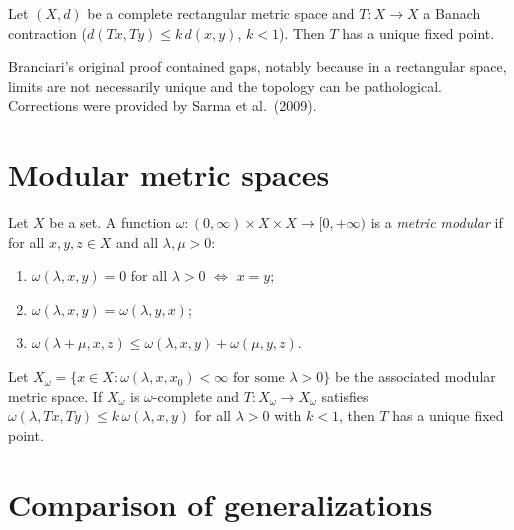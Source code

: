 \begin{theorem}[Branciari, 2000]
Let $(X, d)$ be a complete rectangular metric space and $T : X \to X$ a Banach
contraction ($d(Tx, Ty) \leq k \, d(x,y)$, $k < 1$). Then $T$ has a unique
fixed point.
\end{theorem}

\begin{warning}[title=\textbf{Subtleties}]
Branciari's original proof contained gaps, notably because in a rectangular
space, limits are not necessarily unique and the topology can be pathological.
Corrections were provided by Sarma et al.\ (2009).
\end{warning}

\section{Modular metric spaces}

\begin{definition}
Let $X$ be a set. A function $\omega : (0, \infty) \times X \times X \to [0, +\infty)$
is a \emph{metric modular} if for all $x, y, z \in X$ and all $\lambda, \mu > 0$:
\begin{enumerate}
    \item $\omega(\lambda, x, y) = 0$ for all $\lambda > 0$ $\Leftrightarrow$ $x = y$;
    \item $\omega(\lambda, x, y) = \omega(\lambda, y, x)$;
    \item $\omega(\lambda + \mu, x, z) \leq \omega(\lambda, x, y) + \omega(\mu, y, z)$.
\end{enumerate}
\end{definition}

\begin{theorem}
Let $X_\omega = \{x \in X : \omega(\lambda, x, x_0) < \infty \text{ for some } \lambda > 0\}$
be the associated modular metric space. If $X_\omega$ is $\omega$-complete and
$T : X_\omega \to X_\omega$ satisfies
$\omega(\lambda, Tx, Ty) \leq k \, \omega(\lambda, x, y)$ for all $\lambda > 0$
with $k < 1$, then $T$ has a unique fixed point.
\end{theorem}

\section{Comparison of generalizations}

